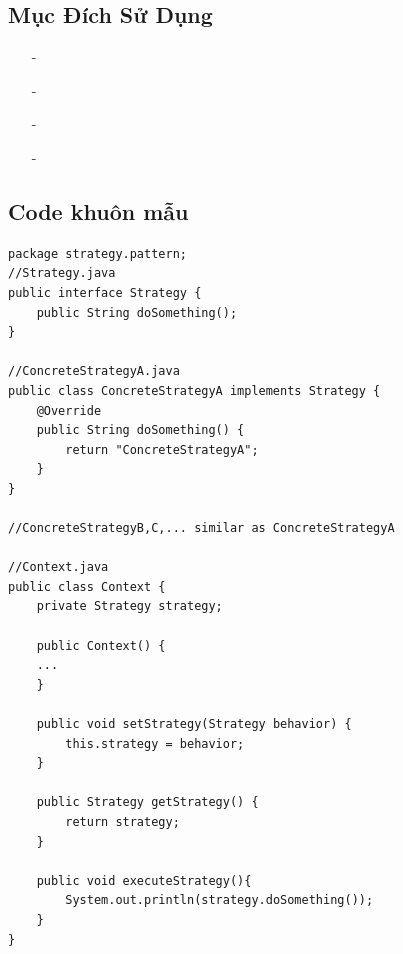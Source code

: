 \documentclass{article}
\newcommand\subpara{\fontsize{13}{13}\selectfont \fontseries{b}\selectfont}
\begin{document}
    \subsection{Mục Đích Sử Dụng}
    \begin{itemize}
        \item[-]\subpara{Muốn thay đổi các thuật toán được sử dụng bên trong một đối tượng tại thời điểm run-time.}
        \item[-]\subpara{Bảo trì những đoạn code dễ thay đổi}
        \item[-]\subpara{Tránh sự rắc rối, khi phải hiện thực một chức năng nào đó qua quá nhiều lớp con.}
        \item[-]\subpara{Che dấu sự phức tạp, cấu trúc bên trong của thuật toán.}
    \end{itemize}

    \subsection{Code khuôn mẫu}
    \begin{lstlisting}
package strategy.pattern;
//Strategy.java
public interface Strategy {
    public String doSomething();
}

//ConcreteStrategyA.java
public class ConcreteStrategyA implements Strategy {
    @Override
    public String doSomething() {
        return "ConcreteStrategyA";
    }
}

//ConcreteStrategyB,C,... similar as ConcreteStrategyA

//Context.java
public class Context {
    private Strategy strategy;

    public Context() {
    ...
    }

    public void setStrategy(Strategy behavior) {
        this.strategy = behavior;
    }

    public Strategy getStrategy() {
        return strategy;
    }

    public void executeStrategy(){
        System.out.println(strategy.doSomething());
    }
}
    \end{lstlisting}
\end{document}
